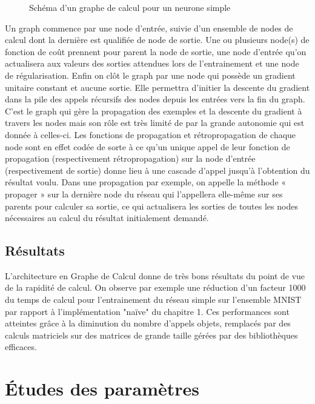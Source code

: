 \documentclass{report}
\begin{document}
\begin{figure}[!h]
\centering


\caption{Schéma d'un graphe de calcul pour un neurone simple}
\label{graphe_de_calcul}
\end{figure}

Un graph commence par une node d'entrée, suivie d'un ensemble de nodes de calcul dont la dernière est qualifiée de node de sortie. Une ou plusieurs node(s) de fonction de coût prennent pour parent la node de sortie, une node d'entrée qu'on actualisera aux valeurs des sorties attendues lors de l'entrainement et une node de régularisation. Enfin on clôt le graph par une node qui possède un gradient unitaire constant et aucune sortie. Elle permettra d'initier la descente du gradient dans la pile des appels récursifs des nodes depuis les entrées vers la fin du graph. C'est le graph qui gère la propagation des exemples et la descente du gradient à travers les nodes mais son rôle est très limité de par la grande autonomie qui est donnée à celles-ci. Les fonctions de propagation et rétropropagation de chaque node sont en effet codée de sorte à ce qu'un unique appel de leur fonction de propagation (respectivement rétropropagation) sur la node d'entrée (respectivement de sortie) donne lieu à une cascade d'appel jusqu'à l'obtention du résultat voulu. Dans une propagation par exemple, on appelle la méthode « propager » sur la dernière node du réseau qui l’appellera elle-même sur ses parents pour calculer sa sortie, ce qui actualisera les sorties de toutes les nodes nécessaires au calcul du résultat initialement demandé.



\section{Résultats}

L'architecture en Graphe de Calcul donne de très bons résultats du point de vue de la rapidité de calcul. On observe par exemple une réduction d'un facteur 1000 du temps de calcul pour l'entrainement du réseau simple sur l'ensemble MNIST par rapport à l'implémentation "naïve" du chapitre 1. Ces performances sont atteintes grâce à la diminution du nombre d'appels objets, remplacés par des calculs matriciels sur des matrices de grande taille gérées par des bibliothèques efficaces.

\chapter{Études des paramètres}
\end{document}
